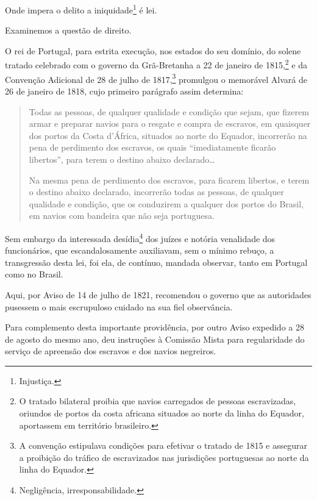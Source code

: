 {Onde impera o delito a iniquidade\footnote{Injustiça.} é lei.

Examinemos a questão de direito.

O rei de Portugal, para estrita execução, nos estados do seu domínio, do
solene tratado celebrado com o governo da Grã-Bretanha a 22 de janeiro
de 1815,\footnote{O tratado bilateral proibia que navios carregados de
  pessoas escravizadas, oriundos de portos da costa africana situados ao
  norte da linha do Equador, aportassem em território brasileiro.} e da
Convenção Adicional de 28 de julho de 1817,\footnote{A convenção
  estipulava condições para efetivar o tratado de 1815 e assegurar a
  proibição do tráfico de escravizados nas jurisdições portuguesas ao
  norte da linha do Equador.} promulgou o memorável Alvará de 26 de
janeiro de 1818, cujo primeiro parágrafo assim determina:

\begin{quote}
Todas as pessoas, de qualquer qualidade e condição que sejam, que
fizerem armar e preparar navios para o resgate e compra de escravos, em
quaisquer dos portos da Costa d'África, situados ao norte do Equador,
incorrerão na pena de perdimento dos escravos, os quais ``imediatamente
ficarão libertos'', para terem o destino abaixo declarado\ldots{}

Na mesma pena de perdimento dos escravos, para ficarem libertos, e terem
o destino abaixo declarado, incorrerão todas as pessoas, de qualquer
qualidade e condição, que os conduzirem a qualquer dos portos do Brasil,
em navios com bandeira que não seja portuguesa.
\end{quote}

\asterisc

Sem embargo da interessada desídia\footnote{Negligência,
  irresponsabilidade.} dos juízes e notória venalidade dos funcionários,
que escandalosamente auxiliavam, sem o mínimo rebuço, a transgressão
desta lei, foi ela, de contínuo, mandada observar, tanto em Portugal
como no Brasil.

Aqui, por Aviso de 14 de julho de 1821, recomendou o governo que as
autoridades pusessem o mais escrupuloso cuidado na sua fiel observância.

Para complemento desta importante providência, por outro Aviso expedido
a 28 de agosto do mesmo ano, deu instruções à Comissão Mista para
regularidade do serviço de apreensão dos escravos e dos navios
negreiros.

}
